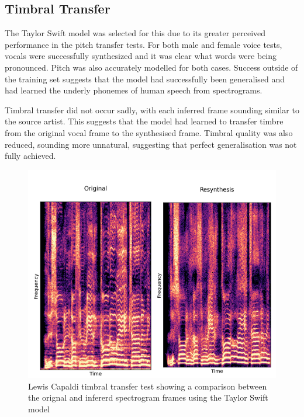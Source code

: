 \subsection{Timbral Transfer}

The Taylor Swift model was selected for this due to its greater perceived performance in the pitch transfer tests. For both male and female voice tests, vocals were successfully synthesized and it was clear what words were being pronounced. Pitch was also accurately modelled for both cases. Success outside of the training set suggests that the model had successfully been generalised and had learned the underly phonemes of human speech from spectrograms.

Timbral transfer did not occur sadly, with each inferred frame sounding similar to the source artist. This suggests that the model had learned to transfer timbre from the original vocal frame to the synthesised frame. Timbral quality was also reduced, sounding more unnatural, suggesting that perfect generalisation was not fully achieved.

\begin{figure}[H]
    \centering
    \includegraphics[width=\textwidth]{research/results/LewisCapaldi/TimbralTransfer.png}
    \caption{Lewis Capaldi timbral transfer test showing a comparison between the orignal and infererd spectrogram frames using the Taylor Swift model}
\end{figure}

